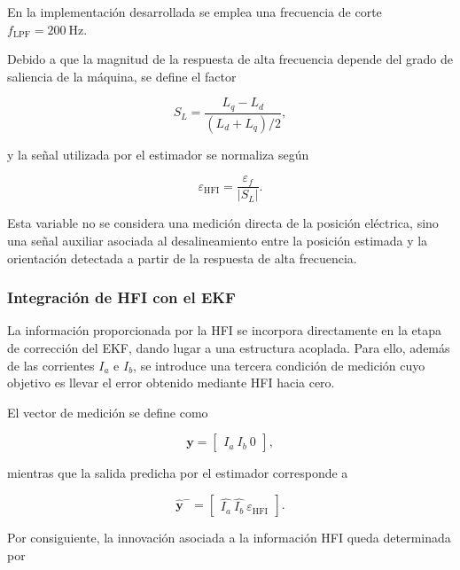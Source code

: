 En la implementación desarrollada se emplea una frecuencia de corte $f_{\mathrm{LPF}}=200~\mathrm{Hz}$.

Debido a que la magnitud de la respuesta de alta frecuencia depende del grado de saliencia de la máquina, se define el factor

\begin{equation}
S_L
=
\frac{L_q-L_d}
{\left(L_d+L_q\right)/2},
\end{equation}

y la señal utilizada por el estimador se normaliza según

\begin{equation}
\varepsilon_{\mathrm{HFI}}
=
\frac{\varepsilon_f}{|S_L|}.
\label{eq:error_hfi_normalizado}
\end{equation}

Esta variable no se considera una medición directa de la posición eléctrica, sino una señal auxiliar asociada al desalineamiento entre la posición estimada y la orientación detectada a partir de la respuesta de alta frecuencia.

\subsubsection{Integración de HFI con el EKF}
\label{subsubsec:hfi_estimador}

La información proporcionada por la HFI se incorpora directamente en la etapa de corrección del EKF, dando lugar a una estructura acoplada. Para ello, además de las corrientes $I_a$ e $I_b$, se introduce una tercera condición de medición cuyo objetivo es llevar el error obtenido mediante HFI hacia cero.

El vector de medición se define como

\begin{equation}
\mathbf{y}
=
\begin{bmatrix}
I_a\
I_b\
0
\end{bmatrix},
\end{equation}

mientras que la salida predicha por el estimador corresponde a

\begin{equation}
\hat{\mathbf{y}}^{-}
=
\begin{bmatrix}
\hat{I_a}\
\hat{I_b}\
\varepsilon_{\mathrm{HFI}}
\end{bmatrix}.
\end{equation}

Por consiguiente, la innovación asociada a la información HFI queda determinada por

